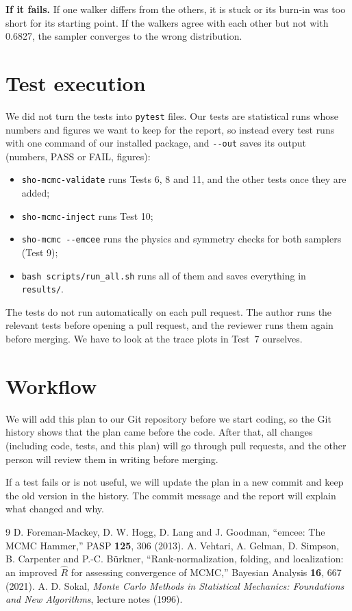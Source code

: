 \documentclass[11pt]{article}
\begin{document}
\textbf{If it fails.} If one walker differs from the others, it is stuck or its
burn-in was too short for its starting point. If the walkers agree with each
other but not with 0.6827, the sampler converges to the wrong distribution.

\section{Test execution}
We did not turn the tests into \texttt{pytest} files. Our tests are statistical runs whose numbers and figures we want to keep for the report, so instead every test runs with one command of our installed package, and \texttt{-{}-out} saves its output (numbers, PASS or FAIL, figures):
\begin{itemize}
  \item \texttt{sho-mcmc-validate} runs Tests 6, 8 and 11, and the other tests once they are added;
  \item \texttt{sho-mcmc-inject} runs Test 10;
  \item \texttt{sho-mcmc -{}-emcee} runs the physics and symmetry checks for both samplers (Test 9);
  \item \texttt{bash scripts/run\_all.sh} runs all of them and saves everything in \texttt{results/}.
\end{itemize}
The tests do not run automatically on each pull request. The author runs the relevant tests before opening a pull request, and the reviewer runs them again before merging. We have to look at the trace plots in Test~7 ourselves.

\section{Workflow}
We will add this plan to our Git repository before we start coding, so the Git history shows that the plan came before the code. After that, all changes (including code, tests, and this plan) will go through pull requests, and the other person will review them in writing before merging.

If a test fails or is not useful, we will update the plan in a new commit and keep the old version in the history. The commit message and the report will explain what changed and why.


\begin{thebibliography}{9}
 D. Foreman-Mackey, D. W. Hogg, D. Lang and J. Goodman, ``emcee: The MCMC Hammer,'' PASP \textbf{125}, 306 (2013).
 A. Vehtari, A. Gelman, D. Simpson, B. Carpenter and P.-C. B\"urkner, ``Rank-normalization, folding, and localization: an improved $\hat R$ for assessing convergence of MCMC,'' Bayesian Analysis \textbf{16}, 667 (2021).
 A. D. Sokal, \emph{Monte Carlo Methods in Statistical Mechanics: Foundations and New Algorithms}, lecture notes (1996).
\end{thebibliography}
\end{document}
